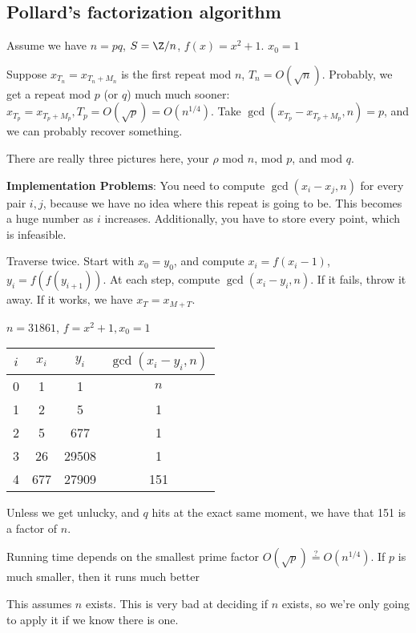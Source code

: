 \documentclass[10pt]{article}
\begin{document}
\subsection{Pollard's factorization algorithm} Assume we have $n = pq$, $S = \Z /n$, $f(x) = x^2 + 1$. $x_0 = 1$

Suppose $x_{T_n} = x_{T_n + M_n}$ is the first repeat mod $n$, $T_n = O(\sqrt{n})$. Probably, we get a repeat mod $p$ (or $q$) much much sooner: $x_{T_p} = x_{T_p + M_p}, T_p = O(\sqrt{p}) = O(n^{1/4})$. Take $\gcd(x_{T_p} - x_{T_p + M_p}, n) = p$, and we can probably recover something. 

There are really three pictures here, your $\rho$ mod $n$, mod $p$, and mod $q$.

\textbf{Implementation Problems}: You need to compute $\gcd(x_i - x_j, n)$ for every pair $i, j$, because we have no idea where this repeat is going to be. This becomes a huge number as $i$ increases. Additionally, you have to store every point, which is infeasible.

\begin{defn}
    Traverse twice. Start with $x_0 = y_0$, and compute $x_i = f(x_i - 1)$, $y_i = f(f(y_{i + 1}))$. At each step, compute $\gcd(x_i - y_i, n)$. If it fails, throw it away. If it works, we have $x_T = x_{M + T}$.
\end{defn}

\begin{exm*}
    $n = 31861$, $f = x^2 + 1, x_0 = 1$
\end{exm*}

\begin{tabular}{c|c|c|c}
    $i$ & $x_i$ & $y_i$ & $\gcd(x_i - y_i, n)$\\
    \hline
    0 & 1 & 1 & $n$\\
    1 & 2 & 5 & 1\\
    2 & 5 & 677 & 1\\
    3 & 26 & 29508& 1\\
    4 & 677 &  27909 & 151\\
\end{tabular}

Unless we get unlucky, and $q$ hits at the exact same moment, we have that 151 is a factor of $n$.

Running time depends on the smallest prime factor $O(\sqrt{p}) \stackrel{?}{=} O(n^{1/4})$. If $p$ is much smaller, then it runs much better

\begin{rmk}
    This assumes $n$ exists. This is very bad at deciding if $n$ exists, so we're only going to apply it if we know there is one.
\end{rmk}
\end{document}
